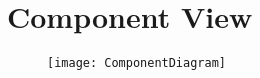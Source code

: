 \section{Component View}

\begin{figure}[H]
	\centering
	\texttt{[image: ComponentDiagram]}
	\caption[Component Diagram]{}
	\label{fig:ComponentDiagram}
\end{figure}
